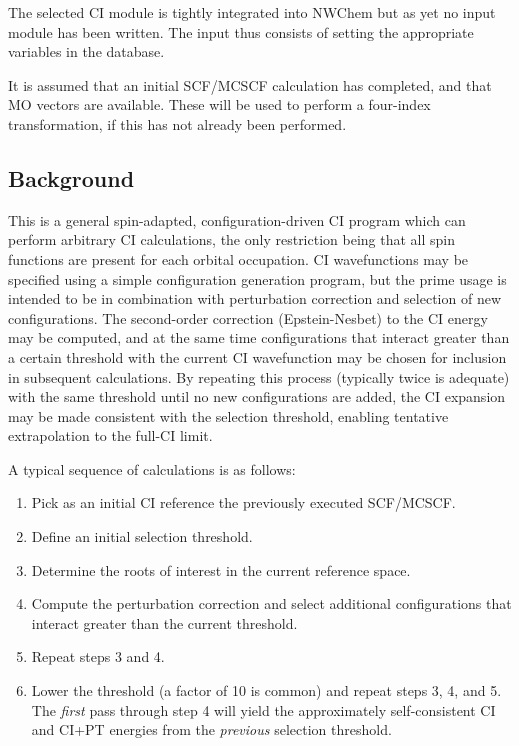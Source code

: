 \label{sec:selci}

The selected CI module is tightly integrated into NWChem but as yet no
input module has been written.  The input thus consists of setting the
appropriate variables in the database.

It is assumed that an initial SCF/MCSCF calculation has completed, and
that MO vectors are available.  These will be used to perform a
four-index transformation, if this has not already been performed.

\subsection{Background}

This is a general spin-adapted, configuration-driven CI program
which can perform arbitrary CI calculations, the only restriction
being that all spin functions are present for each orbital occupation.
CI wavefunctions may be specified using a simple configuration
generation program, but the prime usage is intended to be in
combination with perturbation correction and selection of new
configurations.  The second-order correction (Epstein-Nesbet) to the
CI energy may be computed, and at the same time configurations that
interact greater than a certain threshold with the current CI
wavefunction may be chosen for inclusion in subsequent calculations.
By repeating this process (typically twice is adequate) with the same
threshold until no new configurations are added, the CI expansion may
be made consistent with the selection threshold, enabling tentative 
extrapolation to the full-CI limit.

A typical sequence of calculations is as follows:
\begin{enumerate}
\item Pick as an initial CI reference the previously executed
  SCF/MCSCF.
\item Define an initial selection threshold.
\item Determine the roots of interest in the current reference space.
\item Compute the perturbation correction and select additional
  configurations that interact greater than the current threshold.
\item Repeat steps 3 and 4.
\item Lower the threshold (a factor of 10 is common) and repeat steps
  3, 4, and 5.  The {\em first} pass through step 4 will yield the
  approximately self-consistent CI and CI+PT energies from the {\em
    previous} selection threshold.
\end{enumerate}

